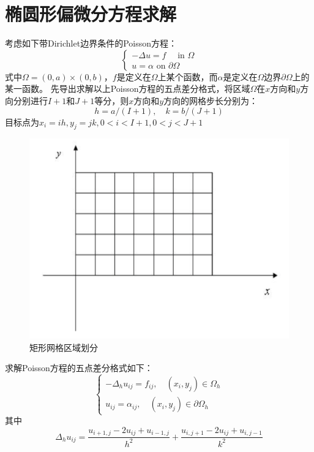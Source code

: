 \documentclass[fontset=mac]{ctexart}
\begin{document}
	\section{椭圆形偏微分方程求解}
	考虑如下带Dirichlet边界条件的Poisson方程：
	$$
	\left\{\begin{array}{l}
		-\Delta u=f \quad \text { in } \Omega \\
		u=\alpha \text { on } \partial \Omega
	\end{array}\right.
	$$
	式中$\Omega = (0,a) \times (0,b)$，$f$是定义在$\Omega$上某个函数，而$\alpha$是定义在$\Omega$边界$\partial \Omega$上的某一函数。
	先导出求解以上Poisson方程的五点差分格式，将区域$\Omega$在$x$方向和$y$方向分别进行$I+1$和$J+1$等分，则$x$方向和$y$方向的网格步长分别为：
	$$
	h=a /(I+1), \quad k=b /(J+1)
	$$
	目标点为$x_i=ih,y_j=jk,0<i<I+1,0<j<J+1$
	\begin{figure}[H]
		\centering
		\includegraphics[width=0.7\linewidth]{fig/fig1}
		\caption{矩形网格区域划分}
	\end{figure}
	
	求解Poisson方程的五点差分格式如下：
	$$
	\left\{\begin{array}{l}
		-\Delta_{h} u_{i j}=f_{i j}, \quad\left(x_{i}, y_{j}\right) \in \Omega_{h} \\
		u_{i j}=\alpha_{i j}, \quad\left(x_{i}, y_{j}\right) \in \partial \Omega_{h}
	\end{array}\right.
	$$
	其中
	$$
	\Delta_{h} u_{i j}=\frac{u_{i+1, j}-2 u_{i j}+u_{i-1, j}}{h^{2}}+\frac{u_{i, j+1}-2 u_{i j}+u_{i, j-1}}{k^{2}}
	$$
	
\end{document}
